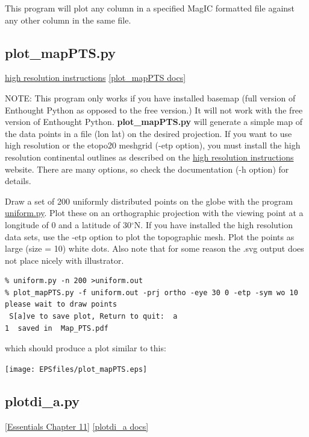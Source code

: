 \documentclass[11pt]{book}
\begin{document}
{{{  This program will plot any column in a specified MagIC formatted file against any other column in the same file.  
  
  \subsection{plot\_mapPTS.py}
  \href{http://earthref.org/PmagPy/hires.html}{high resolution instructions}
  \href{http://earthref.org/PmagPy/pmagpydocs/plot_mapPTS-module.html}{[plot\_mapPTS docs]}

NOTE:  This program only works if you have installed basemap (full version of Enthought Python as opposed to the free version.)  It will not work with the free version of Enthought Python.  {\bf plot\_mapPTS.py} will generate a simple map of the data points in a file (lon lat) on the desired projection.    
If you want to use high resolution or the etopo20 meshgrid (-etp option), you must install the high resolution continental outlines as described on the  \href{http://earthref.org/PmagPy/hires.html}{high resolution instructions} website.  There are many options, so check the documentation (-h option) for details.  

Draw a set of 200 uniformly distributed points on the globe with the program \href{#uniform.py}{uniform.py}.  Plot these on an orthographic projection with the viewing point at a longitude of 0 and a latitude of 30$^{\circ}$N.  If you have installed the high resolution data sets, use the -etp option to plot the topographic mesh.  Plot the points as large (size = 10) white dots.  Also note that for some reason the .svg output does not place nicely with illustrator.  

\begin{verbatim}
% uniform.py -n 200 >uniform.out 
% plot_mapPTS.py -f uniform.out -prj ortho -eye 30 0 -etp -sym wo 10
please wait to draw points
 S[a]ve to save plot, Return to quit:  a
1  saved in  Map_PTS.pdf
\end{verbatim}

which should produce a plot similar to this:

\texttt{[image: EPSfiles/plot\_mapPTS.eps]}



  
\subsection{plotdi\_a.py} 
\href{http://magician.ucsd.edu/Essentials_2/WebBook2ch11.html#ch11}{[Essentials Chapter 11]}
\href{http://earthref.org/PmagPy/pmagpydocs/plotdi_a-module.html}{[plotdi\_a docs]}

}}}
\end{document}
